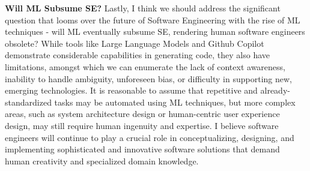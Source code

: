 \documentclass[a4paper, 11pt]{article}
\begin{document}

\noindent \textbf{Will ML Subsume SE?} Lastly, I think we should address the significant question that looms over the future of Software Engineering with the rise of ML techniques - will ML eventually subsume SE, rendering human software engineers obsolete? While tools like Large Language Models and Github Copilot demonstrate considerable capabilities in generating code, they also have limitations, amongst which we can enumerate the lack of context awareness, inability to handle ambiguity, unforeseen bias, or difficulty in supporting new, emerging technologies. It is reasonable to assume that repetitive and already-standardized tasks may be automated using ML techniques, but more complex areas, such as system architecture design or human-centric user experience design, may still require human ingenuity and expertise. I believe software engineers will continue to play a crucial role in conceptualizing, designing, and implementing sophisticated and innovative software solutions that demand human creativity and specialized domain knowledge.



\end{document}
